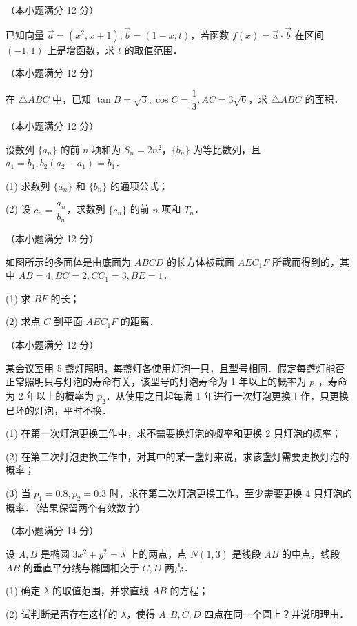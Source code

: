 \begin{question}
（本小题满分 12 分）

已知向量 $\vec{a} = (x^2, x + 1), \vec{b} = (1 - x, t)$，若函数 $f(x) = \vec{a} \cdot \vec{b}$ 在区间 $(-1, 1)$ 上是增函数，求 $t$ 的取值范围．

\end{question}
\begin{question}
（本小题满分 12 分）

在 $\triangle ABC$ 中，已知 $\tan B = \sqrt{3}, \cos C = \dfrac{1}{3}, AC = 3\sqrt{6}$，求 $\triangle ABC$ 的面积．

\end{question}
\begin{question}
（本小题满分 12 分）

设数列 $\{a_n\}$ 的前 $n$ 项和为 $S_n = 2n^2$，$\{b_n\}$ 为等比数列，且 $a_1 = b_1, b_2(a_2 - a_1) = b_1$．

(1) 求数列 $\{a_n\}$ 和 $\{b_n\}$ 的通项公式；

(2) 设 $c_n = \dfrac{a_n}{b_n}$，求数列 $\{c_n\}$ 的前 $n$ 项和 $T_n$．

\Needspace{0.4\textheight}
\end{question}
\begin{question}
（本小题满分 12 分）

如图所示的多面体是由底面为 $ABCD$ 的长方体被截面 $AEC_1F$ 所截而得到的，其中 $AB = 4, BC = 2, CC_1 = 3, BE = 1$．
\nopagebreak[4]
\begin{center}\end{center}
\nopagebreak[4]
(1) 求 $BF$ 的长；

(2) 求点 $C$ 到平面 $AEC_1F$ 的距离．

\end{question}
\begin{question}
（本小题满分 12 分）

某会议室用 5 盏灯照明，每盏灯各使用灯泡一只，且型号相同．假定每盏灯能否正常照明只与灯泡的寿命有关，该型号的灯泡寿命为 1 年以上的概率为 $p_1$，寿命为 2 年以上的概率为 $p_2$．从使用之日起每满 1 年进行一次灯泡更换工作，只更换已坏的灯泡，平时不换．

(1) 在第一次灯泡更换工作中，求不需要换灯泡的概率和更换 2 只灯泡的概率；

(2) 在第二次灯泡更换工作中，对其中的某一盏灯来说，求该盏灯需要更换灯泡的概率；

(3) 当 $p_1 = 0.8, p_2 = 0.3$ 时，求在第二次灯泡更换工作，至少需要更换 4 只灯泡的概率．（结果保留两个有效数字）

\end{question}
\begin{question}
（本小题满分 14 分）

设 $A, B$ 是椭圆 $3x^2 + y^2 = \lambda$ 上的两点，点 $N(1, 3)$ 是线段 $AB$ 的中点，线段 $AB$ 的垂直平分线与椭圆相交于 $C, D$ 两点．

(1) 确定 $\lambda$ 的取值范围，并求直线 $AB$ 的方程；

(2) 试判断是否存在这样的 $\lambda$，使得 $A, B, C, D$ 四点在同一个圆上？并说明理由．

\end{question}